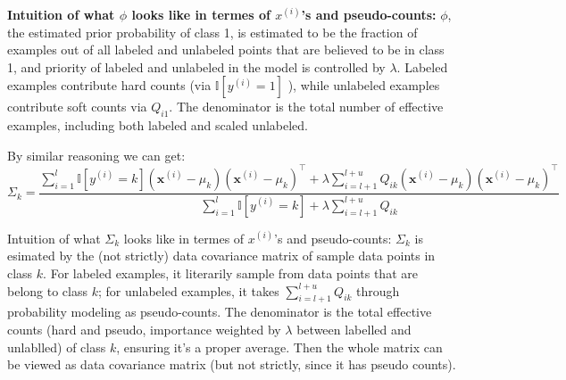 \documentclass[lang=cn,11pt]{elegantbook}
\begin{document}
\textbf{Intuition of what $\phi$ looks like in termes of $x^{(i)}$'s and pseudo-counts:}
$\phi$, the estimated prior probability of class 1, is estimated to be the fraction of examples out of all labeled and unlabeled points that are believed to be in class 1, and priority of labeled and unlabeled in the model is controlled by $\lambda$.
Labeled examples contribute hard counts (via $\mathbb{I}\left[y^{(i)}=1\right]$ ), while unlabeled examples contribute soft counts via $Q_{i 1}$.
The denominator is the total number of effective examples, including both labeled and scaled unlabeled.


By similar reasoning we can get:
\[
{\Sigma}_k=\frac{\sum_{i=1}^l \mathbb{I}\left[y^{(i)}=k\right]\left(\mathbf{x}^{(i)}-{\mu}_k\right)\left(\mathbf{x}^{(i)}-{\mu}_k\right)^{\top}+\lambda \sum_{i=l+1}^{l+u} Q_{i k}\left(\mathbf{x}^{(i)}-{\mu}_k\right)\left(\mathbf{x}^{(i)}-{\mu}_k\right)^{\top}}{\sum_{i=1}^l \mathbb{I}\left[y^{(i)}=k\right]+\lambda \sum_{i=l+1}^{l+u} Q_{i k}}
\]


Intuition of what $\Sigma_k$ looks like in termes of $x^{(i)}$'s and pseudo-counts: 
${\Sigma}_k$ is esimated by the (not strictly) data covariance matrix of sample data points in class $k$. 
For labeled examples, it literarily sample from data points that are belong to class $k$; for unlabeled examples, it takes $\sum_{i=l+1}^{l+u} Q_{i k}$ through probability modeling as pseudo-counts. The denominator is the total effective counts (hard and pseudo, importance weighted by $\lambda$ between labelled and unlablled) of class $k$, ensuring it's a proper average. Then the whole matrix can be viewed as data covariance matrix (but not strictly, since it has pseudo counts).
\end{document}
